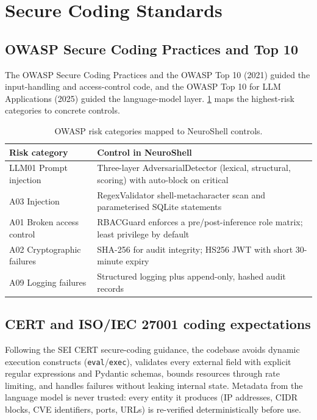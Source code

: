 \documentclass[10pt,journal,onecolumn]{IEEEtran}
\begin{document}
\section{Secure Coding Standards}

\subsection{OWASP Secure Coding Practices and Top 10}
The OWASP Secure Coding Practices and the OWASP Top 10 (2021) guided the
input-handling and access-control code, and the OWASP Top 10 for LLM
Applications (2025) guided the language-model layer. \cref{tab:owasp}
maps the highest-risk categories to concrete controls.

\begin{table}[htbp]
  \centering
  \footnotesize
  \begin{tabular}{@{}p{}p{}@{}}
    \toprule
    \textbf{Risk category} & \textbf{Control in NeuroShell}\\
    \midrule
    LLM01 Prompt injection & Three-layer AdversarialDetector (lexical, structural, scoring) with auto-block on critical\\
    A03 Injection & RegexValidator shell-metacharacter scan and parameterised SQLite statements\\
    A01 Broken access control & RBACGuard enforces a pre/post-inference role matrix; least privilege by default\\
    A02 Cryptographic failures & SHA-256 for audit integrity; HS256 JWT with short 30-minute expiry\\
    A09 Logging failures & Structured logging plus append-only, hashed audit records\\
    \bottomrule
  \end{tabular}
  \caption{OWASP risk categories mapped to NeuroShell controls.}\label{tab:owasp}
\end{table}

\subsection{CERT and ISO/IEC 27001 coding expectations}
Following the SEI CERT secure-coding guidance, the codebase avoids
dynamic execution constructs (\texttt{eval}/\texttt{exec}), validates
every external field with explicit regular expressions and Pydantic
schemas, bounds resources through rate limiting, and handles failures
without leaking internal state. Metadata from the language model is never
trusted: every entity it produces (IP addresses, CIDR blocks, CVE
identifiers, ports, URLs) is re-verified deterministically before use.
\end{document}
